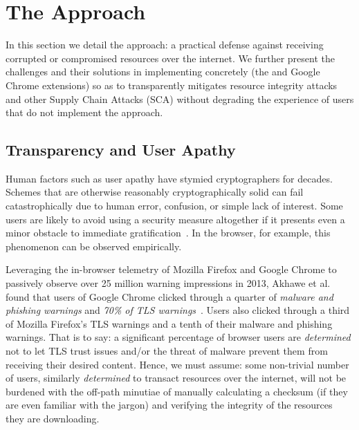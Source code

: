 \section{The \SYSTEM{} Approach} \label{sec:approach}

In this section we detail the \SYSTEM{} approach: a practical defense against
receiving corrupted or compromised resources over the internet. We further
present the challenges and their solutions in implementing \SYSTEM{} concretely
(\ie the \DNSSYS{} and \DHTSYS{} Google Chrome extensions) so as to transparently
mitigates resource integrity attacks and other Supply Chain Attacks (SCA)
without degrading the experience of users that do not implement the \SYSTEM{}
approach.


\subsection{Transparency and User Apathy}

Human factors such as user apathy have stymied cryptographers for decades.
Schemes that are otherwise reasonably cryptographically solid can fail
catastrophically due to human error, confusion, or simple lack of interest. Some
users are likely to avoid using a security measure altogether if it presents
even a minor obstacle to immediate gratification~\cite{Clickthrough, PGPBad}. In
the browser, for example, this phenomenon can be observed empirically.

Leveraging the in-browser telemetry of Mozilla Firefox and Google Chrome to
passively observe over 25 million warning impressions in 2013, Akhawe et al.
found that users of Google Chrome clicked through a quarter of \emph{malware and
phishing warnings} and \emph{70\% of TLS warnings}~\cite{Clickthrough}. Users
also clicked through a third of Mozilla Firefox's TLS warnings and a tenth of
their malware and phishing warnings. That is to say: a significant percentage of
browser users are \emph{determined} not to let TLS trust issues and/or the
threat of malware prevent them from receiving their desired content. Hence, we
must assume: some non-trivial number of users, similarly \emph{determined} to
transact resources over the internet, will not be burdened with the off-path
minutiae of manually calculating a checksum (if they are even familiar with the
jargon) and verifying the integrity of the resources they are downloading.

